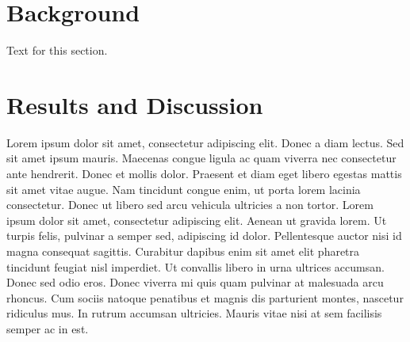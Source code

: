 \documentclass[10pt]{bmc_article}
\newenvironment{bmcformat}{\fussy\setboolean{publ}{true}}{\fussy}
\begin{document}
\begin{bmcformat}




\section*{Background}
Text for this section.\cite{koon,oreg,khar,zvai,xjon,schn,pond,smith,marg,hunn,advi,koha,mouse}


 
\section*{Results and Discussion}

Lorem ipsum dolor sit amet, consectetur adipiscing
elit. Donec a diam lectus. Sed sit amet ipsum mauris. Maecenas congue
ligula ac quam viverra nec consectetur ante hendrerit. Donec et mollis
dolor. Praesent et diam eget libero egestas mattis sit amet vitae
augue. Nam tincidunt congue enim, ut porta lorem lacinia
consectetur. Donec ut libero sed arcu vehicula ultricies a non
tortor. Lorem ipsum dolor sit amet, consectetur adipiscing
elit. Aenean ut gravida lorem. Ut turpis felis, pulvinar a semper sed,
adipiscing id dolor. Pellentesque auctor nisi id magna consequat
sagittis. Curabitur dapibus enim sit amet elit pharetra tincidunt
feugiat nisl imperdiet. Ut convallis libero in urna ultrices
accumsan. Donec sed odio eros. Donec viverra mi quis quam pulvinar at
malesuada arcu rhoncus. Cum sociis natoque penatibus et magnis dis
parturient montes, nascetur ridiculus mus. In rutrum accumsan
ultricies. Mauris vitae nisi at sem facilisis semper ac in est.






\end{bmcformat}
\end{document}
